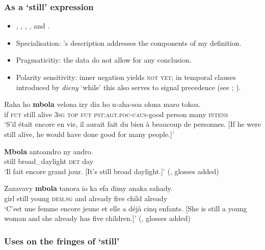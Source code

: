 \subsubsection{As a  \lq still\rq{ }expression}
\begin{itemize}
	\item \textcite[536–537]{Dez1980}, \textcite[71]{Garvey1964}, \textcite[80, 151]{Malzac1960}, \textcite{Rackowski1998}, \textcite[12, 69]{Rajaonarimanana2001} and \textcite{MalagasyPhd}.
	\item Specialisation: \citeauthor{Dez1980}'s description addresses the components of my definition.
	\item Pragmaticitiy: the data do not allow for any conclusion.
	\item Polarity sensitivity: inner negation yields \textsc{not yet}; in temporal clauses introduced by \textit{dieny} \lq while' this also serves to signal precedence (see \cite[460]{Dez1980}; \cite[12]{MalagasyDictionary}).
\end{itemize}
\begin{exe}
	\ex\label{exAppendixMalagasy1}
	\gll Raha ho \textbf{mbola} velona izy dia ho n-aha-soa olona maro tokoa.\\
	if \textsc{fut} still alive 3\textsc{sg} \textsc{top} \textsc{fut} \textsc{pst}:\textsc{agt}.\textsc{foc}-\textsc{caus}-good person many \textsc{intens}\\
	\glt \lq S\rq{}il était encore en vie, il aurait fait du bien à beaucoup de personnes. [If he were still alive, he would have done good for many people.]\rq{ }\parencite[90]{Dez1980}
	
	\ex\label{exAppendixMalagasy2}
	\gll \textbf{Mbola} antoandro ny andro.\\
	still broad\_daylight \textsc{det} day\\
	\glt \lq Il fait encore grand jour. [It's still broad daylight.]\rq{ }(\cite[151]{Malzac1960}, glosses added)

	\ex\label{exAppendixMalagasy3}
	\gll Zazavavy \textbf{mbola} tanora io ka efa dimy anaka sahady.\\
	girl still young \textsc{dem}.\textsc{sg} and already five child already\\
	\glt \lq C’est une femme encore jeune et elle a déjà cinq enfants. [She is still a young woman and she already has five children.]\rq{ }(\cite[151]{Dez1980}, glosses added)
\end{exe}

\subsubsection{Uses on the fringes of \lq still\rq{}}

